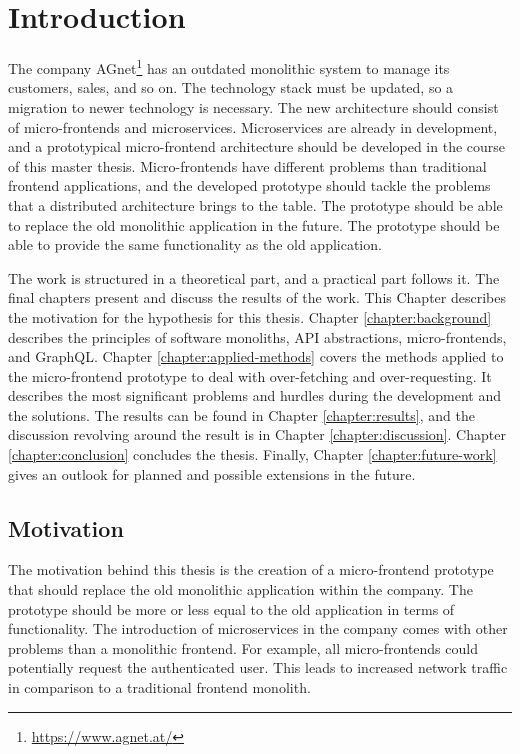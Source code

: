 \chapter{Introduction}\label{chapter:introduction}

The company AGnet\footnote{\url{https://www.agnet.at/}} has an outdated monolithic system to manage its customers, sales, and so on. The technology stack must be updated, so a migration to newer technology is necessary. The new architecture should consist of micro-frontends and microservices. Microservices are already in development, and a prototypical micro-frontend architecture should be developed in the course of this master thesis. Micro-frontends have different problems than traditional frontend applications, and the developed prototype should tackle the problems that a distributed architecture brings to the table. The prototype should be able to replace the old monolithic application in the future. The prototype should be able to provide the same functionality as the old application.


\bigskip

\noindent The work is structured in a theoretical part, and a practical part follows it. The final chapters present and discuss the results of the work. This Chapter describes the motivation for the hypothesis for this thesis. Chapter \ref{chapter:background} describes the principles of software monoliths, \ac{API} abstractions, micro-frontends, and GraphQL. Chapter \ref{chapter:applied-methods} covers the methods applied to the micro-frontend prototype to deal with over-fetching and over-requesting. It describes the most significant problems and hurdles during the development and the solutions. The results can be found in Chapter \ref{chapter:results}, and the discussion revolving around the result is in Chapter \ref{chapter:discussion}. Chapter \ref{chapter:conclusion} concludes the thesis. Finally, Chapter \ref{chapter:future-work} gives an outlook for planned and possible extensions in the future.

\section{Motivation}\label{section:introduction:motivation}

The motivation behind this thesis is the creation of a micro-frontend prototype that should replace the old monolithic application within the company. The prototype should be more or less equal to the old application in terms of functionality. The introduction of microservices in the company comes with other problems than a monolithic frontend. For example, all micro-frontends could potentially request the authenticated user. This leads to increased network traffic in comparison to a traditional frontend monolith.

